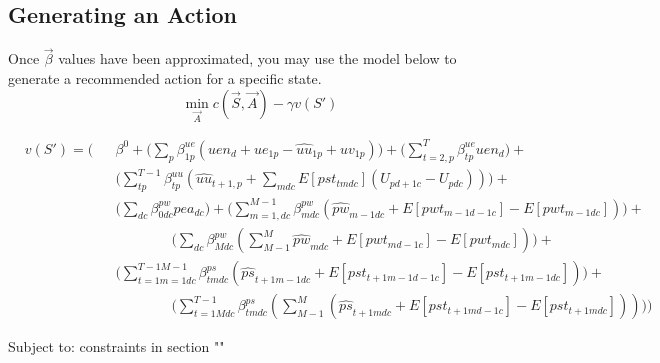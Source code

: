 \documentclass{article}
\begin{document}
\subsection{Generating an Action}
Once $\vec{\beta}$ values have been approximated, you may use the model below to generate a recommended action for a specific state.
\begin{equation*}
	\min_{\vec{A}} c(\vec{S}, \vec{A}) - \gamma v(S')
\end{equation*}	

\begin{equation}\begin{alignedat}{10}
	&	v(S') = \Bigg( 
		&& 	\beta^0 + 
			\bigg( \sum_{p} \beta_{1p}^{ue} 
				(uen_{d} + ue_{1p} - \hat{uu}_{1p} + uv_{1p}) \bigg)+
			\bigg( \sum_{t=2,p}^{T} \beta_{tp}^{ue} uen_{d} \bigg)+ \\
	&	&& 	\bigg( \sum_{tp}^{T-1} \beta_{tp}^{uu} 
				( \hat{uu}_{t+1,p} + \sum_{mdc} E[pst_{tmdc}] (U_{pd+1c} - U_{pdc})) \bigg) + \\
	&	&&	\bigg( \sum_{dc} \beta_{0dc}^{pw} pea_{dc} \bigg) +
			\bigg( \sum_{m=1,dc}^{M-1} \beta_{mdc}^{pw} 
				(\hat{pw}_{m-1dc} + E[pwt_{m-1d-1c}] - E[pwt_{m-1dc}]) \bigg) + \\
	&	&&	\qquad \qquad \bigg( \sum_{dc} \beta_{Mdc}^{pw} 
				(\sum_{M-1}^{M} \hat{pw}_{mdc} + E[pwt_{md-1c}] - E[pwt_{mdc}])\bigg) + \\
	& 	&&	\bigg( \sum_{t=1m=1dc}^{T-1M-1} \beta_{tmdc}^{ps} 
				(\hat{ps}_{t+1m-1dc} + E[pst_{t+1m-1d-1c}] - E[pst_{t+1m-1dc}]) \bigg) + \\	
	&	&&	\qquad \qquad \bigg( \sum_{t=1Mdc}^{T-1} \beta_{tmdc}^{ps} 
				(\sum_{M-1}^{M} (\hat{ps}_{t+1mdc} + E[pst_{t+1md-1c}] - E[pst_{t+1mdc}])) \bigg)
			\Bigg)
\end{alignedat}
\end{equation}

Subject to:
constraints in section ""
\end{document}
